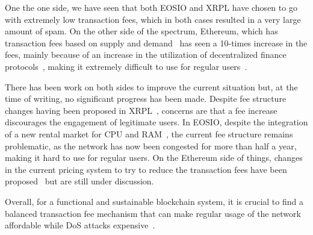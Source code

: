 One the one side, we have seen that both EOSIO and XRPL have chosen to go with extremely low transaction fees, which in both cases resulted in a very large amount of spam.
On the other side of the spectrum, Ethereum, which has transaction fees based on supply and demand~\cite{Wood2014} has seen a 10-times increase in the fees, mainly because of an increase in the utilization of decentralized finance protocols~\cite{gudgeon2020defi}, making it extremely difficult to use for regular users~\cite{eth-defi-gas}.

There has been work on both sides to improve the current situation but, at the time of writing, no significant progress has been made.
Despite fee structure changes having been proposed in XRPL~\cite{xrp-fees}, concerns are that a fee increase discourages the engagement of legitimate users.
In EOSIO, despite the integration of a new rental market for CPU and RAM~\cite{eos-rental-market}, the current fee structure remains problematic, as the network has now been congested for more than half a year, making it hard to use for regular users.
On the Ethereum side of things, changes in the current pricing system to try to reduce the transaction fees have been proposed~\cite{eip-1559} but are still under discussion.

Overall, for a functional and sustainable blockchain system, it is crucial to find a balanced transaction fee mechanism that can make regular usage of the network affordable while DoS attacks expensive~\cite{dblp:conf/ndss/0002l20}.
